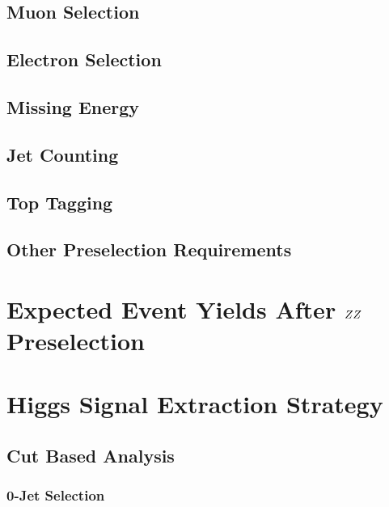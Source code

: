 \documentclass{cmspaper}
\begin{document}
  \subsection{Muon Selection} 
%   
  \subsection{Electron Selection} 
    \label{sec:sel_electrons}
%    
  \subsection{Missing Energy} 
%    
  \subsection{Jet Counting} 
%    
  \subsection{Top Tagging}
%    
  \subsection{Other Preselection Requirements}
%    

\section{Expected Event Yields After $ZZ$ Preselection}
  \label{sec:yields}
  

\clearpage    
\section{Higgs Signal Extraction Strategy}
  
  \label{sec:signal_selection}
  \subsection{Cut Based Analysis}
    \label{sec:anal_cutbased}
    \subsubsection{0-Jet Selection}
      \label{sec:sel_zerojet}
\end{document}
